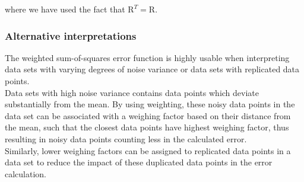 \documentclass[a4paper]{article}
\begin{document}
where we have used the fact that $\mathrm{R}^T = \mathrm{R}$.\\

\subsubsection{Alternative interpretations}
The weighted sum-of-squares error function is highly usable when interpreting data sets with varying degrees of noise variance or data sets with replicated data points.\\

Data sets with high noise variance contains data points which deviate substantially from the mean. By using weighting, these noisy data points in the data set can be associated with a weighing factor based on their distance from the mean, such that the closest data points have highest weighing factor, thus resulting in noisy data points counting less in the calculated error.\\

Similarly, lower weighing factors can be assigned to replicated data points in a data set to reduce the impact of these duplicated data points in the error calculation.
\end{document}
